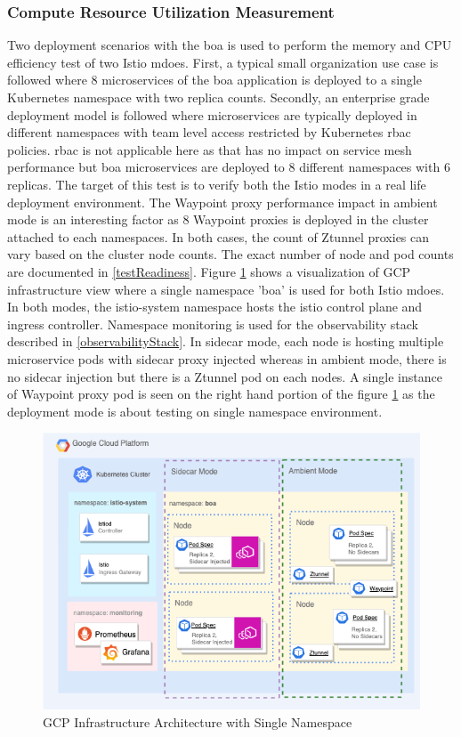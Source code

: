 \subsubsection{Compute Resource Utilization Measurement}
Two deployment scenarios with the \acrshort{boa} is used to perform the memory and CPU efficiency test of two Istio mdoes. First, a typical small organization use case is followed where 8 microservices of the \acrshort{boa} application is deployed to a single Kubernetes namespace with two replica counts. Secondly, an enterprise grade deployment model is followed where microservices are typically deployed in different namespaces with team level access restricted by Kubernetes \acrlong{rbac} policies. \acrshort{rbac} is not applicable here as that has no impact on service mesh performance but  \acrshort{boa} microservices are deployed to 8 different namespaces with 6 replicas. The target of this test is to verify both the Istio modes in a real life deployment environment. The Waypoint proxy performance impact in ambient mode is an interesting factor as 8 Waypoint proxies is deployed in the cluster attached to each namespaces. In both cases, the count of Ztunnel proxies can vary based on the cluster node counts. The exact number of node and pod counts are documented in \ref{testReadiness}. Figure \ref{method:singleNsInfraArch} shows a visualization of GCP infrastructure view where a single namespace 'boa' is used for both Istio mdoes. In both modes, the istio-system namespace hosts the istio control plane and ingress controller. Namespace monitoring is used for the observability stack described in \ref{observabilityStack}. In sidecar mode, each node is hosting multiple microservice pods with sidecar proxy injected whereas in ambient mode, there is no sidecar injection but there is a Ztunnel pod on each nodes. A single instance of Waypoint proxy pod is seen on the right hand portion of the figure \ref{method:singleNsInfraArch} as the deployment mode is about testing on single namespace environment.

\begin{figure}[ht!]
    \centering
    \includegraphics[width=1.0\linewidth]{resources/single-ns-test-infra.drawio.png}
    \caption{GCP Infrastructure Architecture with Single Namespace}
    \label{method:singleNsInfraArch}
\end{figure}

